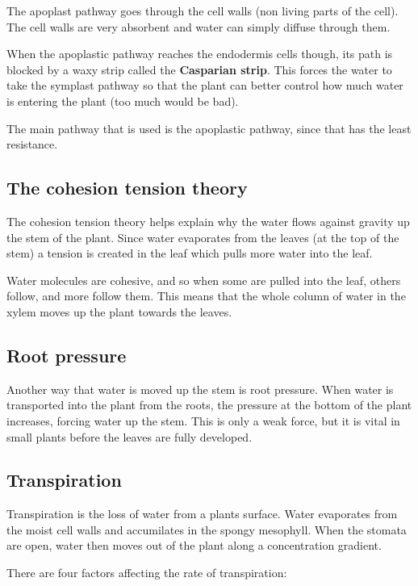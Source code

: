 \documentclass{article}
\begin{document}
The apoplast pathway goes through the cell walls (non living parts of the cell).
The cell walls are very absorbent and water can simply diffuse through them.

When the apoplastic pathway reaches the endodermis cells though, its path is
blocked by a waxy strip called the {\bf Casparian strip}. This forces the water
to take the symplast pathway so that the plant can better control how much water
is entering the plant (too much would be bad).

The main pathway that is used is the apoplastic pathway, since that has the
least resistance.

\subsection*{The cohesion tension theory}

The cohesion tension theory helps explain why the water flows against gravity up
the stem of the plant. Since water evaporates from the leaves (at the top of the
stem) a tension is created in the leaf which pulls more water into the leaf.

Water molecules are cohesive, and so when some are pulled into the leaf, others
follow, and more follow them. This means that the whole column of water in the
xylem moves up the plant towards the leaves.

\subsection*{Root pressure}

Another way that water is moved up the stem is root pressure. When water is
transported into the plant from the roots, the pressure at the bottom of the
plant increases, forcing water up the stem. This is only a weak force, but it is
vital in small plants before the leaves are fully developed.

\subsection*{Transpiration}

Transpiration is the loss of water from a plants surface. Water evaporates from
the moist cell walls and accumilates in the spongy mesophyll. When the stomata
are open, water then moves out of the plant along a concentration gradient.

There are four factors affecting the rate of transpiration:
\end{document}
